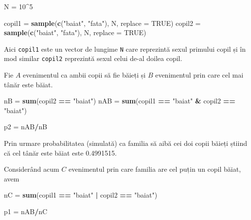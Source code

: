 \documentclass[]{article}
\newenvironment{Shaded}{\begin{snugshade}}{\end{snugshade}}
\newcommand{\DataTypeTok}[1]{\textcolor[rgb]{0.13,0.29,0.53}{#1}}
\newcommand{\DecValTok}[1]{\textcolor[rgb]{0.00,0.00,0.81}{#1}}
\newcommand{\KeywordTok}[1]{\textcolor[rgb]{0.13,0.29,0.53}{\textbf{#1}}}
\newcommand{\NormalTok}[1]{#1}
\newcommand{\OperatorTok}[1]{\textcolor[rgb]{0.81,0.36,0.00}{\textbf{#1}}}
\newcommand{\OtherTok}[1]{\textcolor[rgb]{0.56,0.35,0.01}{#1}}
\newcommand{\StringTok}[1]{\textcolor[rgb]{0.31,0.60,0.02}{#1}}
\begin{document}
\begin{Shaded}
\begin{Highlighting}[]
\NormalTok{N =}\StringTok{ }\DecValTok{10}\OperatorTok{^}\DecValTok{5}

\NormalTok{copil1 =}\StringTok{ }\KeywordTok{sample}\NormalTok{(}\KeywordTok{c}\NormalTok{(}\StringTok{"baiat"}\NormalTok{, }\StringTok{"fata"}\NormalTok{), N, }\DataTypeTok{replace =} \OtherTok{TRUE}\NormalTok{)}
\NormalTok{copil2 =}\StringTok{ }\KeywordTok{sample}\NormalTok{(}\KeywordTok{c}\NormalTok{(}\StringTok{"baiat"}\NormalTok{, }\StringTok{"fata"}\NormalTok{), N, }\DataTypeTok{replace =} \OtherTok{TRUE}\NormalTok{)}
\end{Highlighting}
\end{Shaded}

Aici \texttt{copil1} este un vector de lungime \texttt{N} care
reprezintă sexul primului copil și în mod similar \texttt{copil2}
reprezintă sexul celui de-al doilea copil.

Fie \(A\) evenimentul ca ambii copii să fie băieți și \(B\) evenimentul
prin care cel mai tânăr este băiat.

\begin{Shaded}
\begin{Highlighting}[]
\NormalTok{nB =}\StringTok{ }\KeywordTok{sum}\NormalTok{(copil2 }\OperatorTok{==}\StringTok{ "baiat"}\NormalTok{)}
\NormalTok{nAB =}\StringTok{ }\KeywordTok{sum}\NormalTok{(copil1 }\OperatorTok{==}\StringTok{ "baiat"} \OperatorTok{&}\StringTok{ }\NormalTok{copil2 }\OperatorTok{==}\StringTok{ "baiat"}\NormalTok{)}

\NormalTok{p2 =}\StringTok{ }\NormalTok{nAB}\OperatorTok{/}\NormalTok{nB}
\end{Highlighting}
\end{Shaded}

Prin urmare probabilitatea (simulată) ca familia să aibă cei doi copii
băieți știind că cel tânăr este băiat este 0.4991515.

Considerând acum \(C\) evenimentul prin care familia are cel puțin un
copil băiat, avem

\begin{Shaded}
\begin{Highlighting}[]
\NormalTok{nC =}\StringTok{ }\KeywordTok{sum}\NormalTok{(copil1 }\OperatorTok{==}\StringTok{ "baiat"} \OperatorTok{|}\StringTok{ }\NormalTok{copil2 }\OperatorTok{==}\StringTok{ "baiat"}\NormalTok{)}

\NormalTok{p1 =}\StringTok{ }\NormalTok{nAB}\OperatorTok{/}\NormalTok{nC}
\end{Highlighting}
\end{Shaded}
\end{document}
